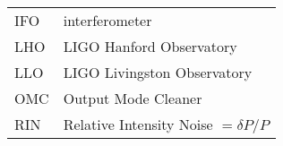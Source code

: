 \label{chapter6}
\doublespace
{}
\begin{tabular}{|l|l|}
IFO & interferometer \\
LHO & LIGO Hanford Observatory \\
LLO & LIGO Livingston Observatory \\
OMC & Output Mode Cleaner \\
RIN & Relative Intensity Noise $=\delta P/P$ \\
\end{tabular}
